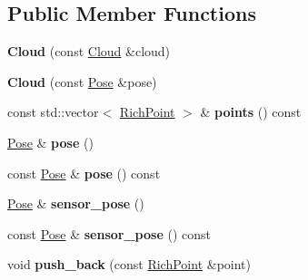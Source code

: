 \subsection*{Public Member Functions}
\begin{DoxyCompactItemize}
\item 
\hypertarget{classdepth__clustering_1_1Cloud_a00490840c02e90434727d71718323d11}{{\bfseries Cloud} (const \hyperlink{classdepth__clustering_1_1Cloud}{Cloud} \&cloud)}\label{classdepth__clustering_1_1Cloud_a00490840c02e90434727d71718323d11}

\item 
\hypertarget{classdepth__clustering_1_1Cloud_abbb28f15b4cb992ef8c685d8ac74497c}{{\bfseries Cloud} (const \hyperlink{classdepth__clustering_1_1Pose}{Pose} \&pose)}\label{classdepth__clustering_1_1Cloud_abbb28f15b4cb992ef8c685d8ac74497c}

\item 
\hypertarget{classdepth__clustering_1_1Cloud_a5da372db201cb4a8bbd3bce2598177fd}{const std\-::vector$<$ \hyperlink{classdepth__clustering_1_1RichPoint}{Rich\-Point} $>$ \& {\bfseries points} () const }\label{classdepth__clustering_1_1Cloud_a5da372db201cb4a8bbd3bce2598177fd}

\item 
\hypertarget{classdepth__clustering_1_1Cloud_a549f7235008ad6e404989ebb621d3d16}{\hyperlink{classdepth__clustering_1_1Pose}{Pose} \& {\bfseries pose} ()}\label{classdepth__clustering_1_1Cloud_a549f7235008ad6e404989ebb621d3d16}

\item 
\hypertarget{classdepth__clustering_1_1Cloud_a011ad64c7d57befd46b34799cb5005d7}{const \hyperlink{classdepth__clustering_1_1Pose}{Pose} \& {\bfseries pose} () const }\label{classdepth__clustering_1_1Cloud_a011ad64c7d57befd46b34799cb5005d7}

\item 
\hypertarget{classdepth__clustering_1_1Cloud_a8aeb9afd4c1b7da85f79f7eb2e4bd432}{\hyperlink{classdepth__clustering_1_1Pose}{Pose} \& {\bfseries sensor\-\_\-pose} ()}\label{classdepth__clustering_1_1Cloud_a8aeb9afd4c1b7da85f79f7eb2e4bd432}

\item 
\hypertarget{classdepth__clustering_1_1Cloud_a3987a18a57215863cf2fbe5122047185}{const \hyperlink{classdepth__clustering_1_1Pose}{Pose} \& {\bfseries sensor\-\_\-pose} () const }\label{classdepth__clustering_1_1Cloud_a3987a18a57215863cf2fbe5122047185}

\item 
\hypertarget{classdepth__clustering_1_1Cloud_a3cb61254a6c969d22810b2097f59b4cf}{void {\bfseries push\-\_\-back} (const \hyperlink{classdepth__clustering_1_1RichPoint}{Rich\-Point} \&point)}\label{classdepth__clustering_1_1Cloud_a3cb61254a6c969d22810b2097f59b4cf}


\end{DoxyCompactItemize}
